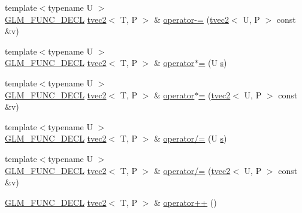 \begin{DoxyCompactItemize}
\item 
{\footnotesize template$<$typename U $>$ }\\\hyperlink{setup_8hpp_ab2d052de21a70539923e9bcbf6e83a51}{G\+L\+M\+\_\+\+F\+U\+N\+C\+\_\+\+D\+E\+CL} \hyperlink{structglm_1_1detail_1_1tvec2}{tvec2}$<$ T, P $>$ \& \hyperlink{structglm_1_1detail_1_1tvec2_a9ab59a567b117ba933525ca8acec41cb}{operator-\/=} (\hyperlink{structglm_1_1detail_1_1tvec2}{tvec2}$<$ U, P $>$ const \&v)
\item 
{\footnotesize template$<$typename U $>$ }\\\hyperlink{setup_8hpp_ab2d052de21a70539923e9bcbf6e83a51}{G\+L\+M\+\_\+\+F\+U\+N\+C\+\_\+\+D\+E\+CL} \hyperlink{structglm_1_1detail_1_1tvec2}{tvec2}$<$ T, P $>$ \& \hyperlink{structglm_1_1detail_1_1tvec2_a8fa08d83addcb4ba1f57efc4be5644cc}{operator$\ast$=} (U \hyperlink{structglm_1_1detail_1_1tvec2_a6d602cf7c31b75396944d828ad2aea72}{s})
\item 
{\footnotesize template$<$typename U $>$ }\\\hyperlink{setup_8hpp_ab2d052de21a70539923e9bcbf6e83a51}{G\+L\+M\+\_\+\+F\+U\+N\+C\+\_\+\+D\+E\+CL} \hyperlink{structglm_1_1detail_1_1tvec2}{tvec2}$<$ T, P $>$ \& \hyperlink{structglm_1_1detail_1_1tvec2_a37dcc7e738554b854e6c2352cd83a567}{operator$\ast$=} (\hyperlink{structglm_1_1detail_1_1tvec2}{tvec2}$<$ U, P $>$ const \&v)
\item 
{\footnotesize template$<$typename U $>$ }\\\hyperlink{setup_8hpp_ab2d052de21a70539923e9bcbf6e83a51}{G\+L\+M\+\_\+\+F\+U\+N\+C\+\_\+\+D\+E\+CL} \hyperlink{structglm_1_1detail_1_1tvec2}{tvec2}$<$ T, P $>$ \& \hyperlink{structglm_1_1detail_1_1tvec2_af6469124c24ce8b406467d7f006f388d}{operator/=} (U \hyperlink{structglm_1_1detail_1_1tvec2_a6d602cf7c31b75396944d828ad2aea72}{s})
\item 
{\footnotesize template$<$typename U $>$ }\\\hyperlink{setup_8hpp_ab2d052de21a70539923e9bcbf6e83a51}{G\+L\+M\+\_\+\+F\+U\+N\+C\+\_\+\+D\+E\+CL} \hyperlink{structglm_1_1detail_1_1tvec2}{tvec2}$<$ T, P $>$ \& \hyperlink{structglm_1_1detail_1_1tvec2_ad98620351ffef7d39ec7111a6be108ce}{operator/=} (\hyperlink{structglm_1_1detail_1_1tvec2}{tvec2}$<$ U, P $>$ const \&v)
\item 
\hyperlink{setup_8hpp_ab2d052de21a70539923e9bcbf6e83a51}{G\+L\+M\+\_\+\+F\+U\+N\+C\+\_\+\+D\+E\+CL} \hyperlink{structglm_1_1detail_1_1tvec2}{tvec2}$<$ T, P $>$ \& \hyperlink{structglm_1_1detail_1_1tvec2_a9678bb2f72ed6a99f99ada6aab54a0ad}{operator++} ()
\item 

\end{DoxyCompactItemize}
